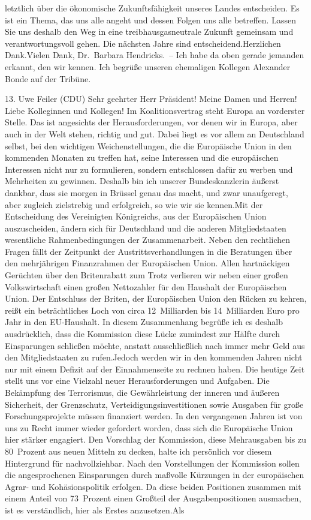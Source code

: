 \documentclass{article}
\begin{document}
letztlich über die ökonomische Zukunftsfähigkeit unseres Landes entscheiden. Es ist ein Thema, das uns alle angeht und dessen Folgen uns alle betreffen. Lassen Sie uns deshalb den Weg in eine treibhausgasneutrale Zukunft gemeinsam und verantwortungsvoll gehen. Die nächsten Jahre sind entscheidend.Herzlichen Dank.Vielen Dank, Dr. Barbara Hendricks. – Ich habe da oben gerade jemanden erkannt, den wir kennen. Ich begrüße unseren ehemaligen Kollegen Alexander Bonde auf der Tribüne.




	13. Uwe Feiler (CDU) Sehr geehrter Herr Präsident! Meine Damen und Herren! Liebe Kolleginnen und Kollegen! Im Koalitionsvertrag steht Europa an vorderster Stelle. Das ist angesichts der Herausforderungen, vor denen wir in Europa, aber auch in der Welt stehen, richtig und gut. Dabei liegt es vor allem an Deutschland selbst, bei den wichtigen Weichenstellungen, die die Europäische Union in den kommenden Monaten zu treffen hat, seine Interessen und die europäischen Interessen nicht nur zu formulieren, sondern entschlossen dafür zu werben und Mehrheiten zu gewinnen. Deshalb bin ich unserer Bundeskanzlerin äußerst dankbar, dass sie morgen in Brüssel genau das macht, und zwar unaufgeregt, aber zugleich zielstrebig und erfolgreich, so wie wir sie kennen.Mit der Entscheidung des Vereinigten Königreichs, aus der Europäischen Union auszuscheiden, ändern sich für Deutschland und die anderen Mitgliedstaaten wesentliche Rahmenbedingungen der Zusammenarbeit. Neben den rechtlichen Fragen fällt der Zeitpunkt der Austrittsverhandlungen in die Beratungen über den mehrjährigen Finanzrahmen der Europäischen Union. Allen hartnäckigen Gerüchten über den Britenrabatt zum Trotz verlieren wir neben einer großen Volkswirtschaft einen großen Nettozahler für den Haushalt der Europäischen Union. Der Entschluss der Briten, der Europäischen Union den Rücken zu kehren, reißt ein beträchtliches Loch von circa 12 Milliarden bis 14 Milliarden Euro pro Jahr in den EU-Haushalt. In diesem Zusammenhang begrüße ich es deshalb ausdrücklich, dass die Kommission diese Lücke zumindest zur Hälfte durch Einsparungen schließen möchte, anstatt ausschließlich nach immer mehr Geld aus den Mitgliedstaaten zu rufen.Jedoch werden wir in den kommenden Jahren nicht nur mit einem Defizit auf der Einnahmenseite zu rechnen haben. Die heutige Zeit stellt uns vor eine Vielzahl neuer Herausforderungen und Aufgaben. Die Bekämpfung des Terrorismus, die Gewährleistung der inneren und äußeren Sicherheit, der Grenzschutz, Verteidigungsinvestitionen sowie Ausgaben für große Forschungsprojekte müssen finanziert werden. In den vergangenen Jahren ist von uns zu Recht immer wieder gefordert worden, dass sich die Europäische Union hier stärker engagiert. Den Vorschlag der Kommission, diese Mehrausgaben bis zu 80 Prozent aus neuen Mitteln zu decken, halte ich persönlich vor diesem Hintergrund für nachvollziehbar. Nach den Vorstellungen der Kommission sollen die angesprochenen Einsparungen durch maßvolle Kürzungen in der europäischen Agrar- und Kohäsionspolitik erfolgen. Da diese beiden Positionen zusammen mit einem Anteil von 73 Prozent einen Großteil der Ausgabenpositionen ausmachen, ist es verständlich, hier als Erstes anzusetzen.Als 
\end{document}
